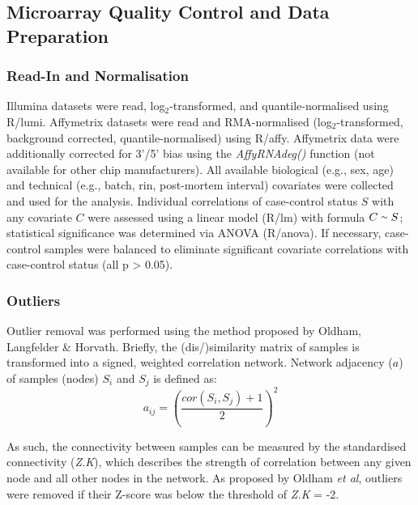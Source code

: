 \begin{method}
\subsection{Microarray Quality Control and Data Preparation}
\subsubsection{Read-In and Normalisation}
Illumina datasets were read, log$_2$-transformed, and quantile-normalised using R/lumi\cite{Du2008}. Affymetrix datasets were read and RMA-normalised (log$_2$-transformed, background corrected, quantile-normalised) using R/affy\cite{Gautier2004}. Affymetrix data were additionally corrected for 3'/5' bias using the \emph{AffyRNAdeg()} function (not available for other chip manufacturers). All available biological (e.g., sex, age) and technical (e.g., batch, \ac{rin}, post-mortem interval) covariates were collected and used for the analysis. Individual correlations of case-control status $S$ with any covariate $C$ were assessed using a linear model (R/lm) with formula $C \smallsim S$; statistical significance was determined via ANOVA (R/anova). If necessary, case-control samples were balanced to eliminate significant covariate correlations with case-control status (all p > 0.05).

\subsubsection{Outliers}
Outlier removal was performed using the method proposed by Oldham, Langfelder \& Horvath\cite{Oldham2012}. Briefly, the (dis\-/)similarity matrix of samples is transformed into a signed, weighted correlation network. Network adjacency ($a$) of samples (nodes) $S_i$ and $S_j$ is defined as: $$a_{ij} = \left(\frac{cor(S_i, S_j)+1}{2}\right)^2$$

As such, the connectivity between samples can be measured by the standardised connectivity (\emph{Z.K}), which describes the strength of correlation between any given node and all other nodes in the network. As proposed by Oldham \emph{et al}, outliers were removed if their Z-score was below the threshold of \emph{Z.K} = -2.


\end{method}
